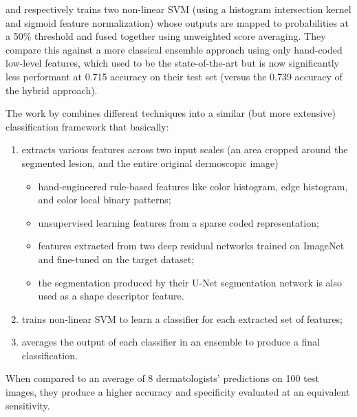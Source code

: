 and respectively trains two non-linear \ac{SVM} (using a histogram intersection kernel and sigmoid feature normalization) whose outputs are mapped to probabilities at a 50\% threshold and fused together using unweighted score averaging. They compare this against a more classical ensemble approach using only hand-coded low-level features, which used to be the state-of-the-art but is now significantly less performant at 0.715 accuracy on their test set (versus the 0.739 accuracy of the hybrid approach).

The work by \citeauthor{hybrid1} \cite{hybrid1} combines different techniques into a similar (but more extensive) classification framework that basically:

\begin{enumerate}
    \item extracts various features across two input scales (an area cropped around the segmented lesion, and the entire original dermoscopic image)
    \begin{itemize}
        \item hand-engineered rule-based features like color histogram, edge histogram, and color local binary patterns;
        \item unsupervised learning features from a sparse coded representation;
        \item features extracted from two deep residual networks trained on ImageNet and fine-tuned on the target dataset;
        \item the segmentation produced by their U-Net segmentation network is also used as a shape descriptor feature.
    \end{itemize}
    \item trains non-linear \ac{SVM} to learn a classifier for each extracted set of features;
    \item averages the output of each classifier in an ensemble to produce a final classification.
\end{enumerate}

When compared to an average of 8 dermatologists' predictions on 100 test images, they produce a higher accuracy and specificity evaluated at an equivalent sensitivity.
